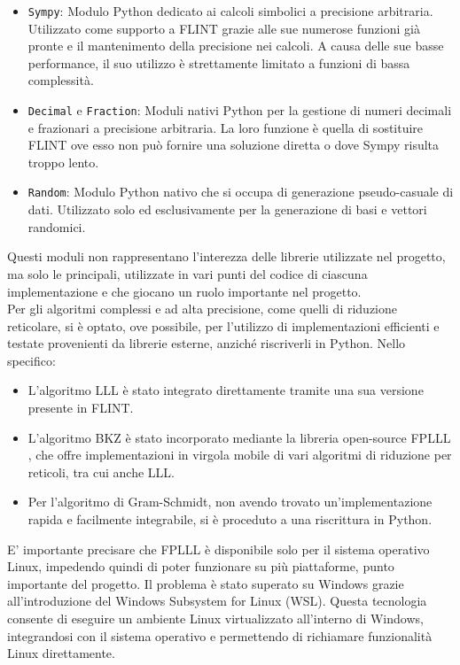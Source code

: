 \begin{itemize}
    \item \texttt{Sympy}: Modulo Python dedicato ai calcoli simbolici a precisione arbitraria.
    Utilizzato come supporto a FLINT grazie alle sue numerose funzioni già pronte e il 
    mantenimento della precisione nei calcoli. A causa delle sue basse performance, il suo
    utilizzo è strettamente limitato a funzioni di bassa complessità.
    \item \texttt{Decimal} e \texttt{Fraction}: Moduli nativi Python per la gestione di numeri decimali e 
    frazionari a precisione arbitraria. La loro funzione è quella di sostituire FLINT ove 
    esso non può fornire una soluzione diretta o dove Sympy risulta troppo lento.
    \item \texttt{Random}: Modulo Python nativo che si occupa di generazione pseudo-casuale di dati.
    Utilizzato solo ed esclusivamente per la generazione di basi e vettori randomici. 
\end{itemize}

Questi moduli non rappresentano l'interezza delle librerie utilizzate nel progetto, ma solo
le principali, utilizzate in vari punti del codice di ciascuna implementazione e che giocano
un ruolo importante nel progetto. \\
Per gli algoritmi complessi e ad alta precisione, come quelli di riduzione reticolare, 
si è optato, ove possibile, per l'utilizzo di implementazioni efficienti e testate 
provenienti da librerie esterne, anziché riscriverli in Python. 
Nello specifico:
\begin{itemize}
    \item L'algoritmo LLL è stato integrato direttamente tramite una sua versione presente in FLINT.
    \item L'algoritmo BKZ è stato incorporato mediante la libreria open-source FPLLL \cite{FPLLL}, 
    che offre implementazioni in virgola mobile di vari algoritmi di riduzione per reticoli, tra cui
    anche LLL.
    \item Per l'algoritmo di Gram-Schmidt, non avendo trovato un'implementazione rapida 
    e facilmente integrabile, si è proceduto a una riscrittura in Python.
\end{itemize}

E' importante precisare che FPLLL è disponibile solo per il sistema operativo Linux, impedendo
quindi di poter funzionare su più piattaforme, punto importante del progetto. Il problema 
è stato superato su Windows grazie all'introduzione del Windows Subsystem for Linux (WSL). 
Questa tecnologia consente di eseguire un ambiente Linux virtualizzato  
all'interno di Windows, integrandosi con il sistema operativo e permettendo di richiamare 
funzionalità Linux direttamente.

%
%

%
%
